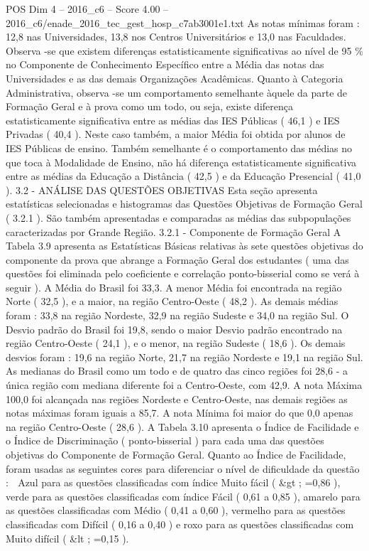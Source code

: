 \begin{textsample}{POS Dim 4 – 2016\_c6 – Score 4.00 – 2016\_c6/enade\_2016\_tec\_gest\_hosp\_c7ab3001e1.txt}
As notas mínimas foram : 12,8 nas Universidades, 13,8 nos Centros Universitários e 13,0 nas Faculdades.
Observa -se que existem diferenças estatisticamente significativas ao nível de 95 \% no Componente de Conhecimento Específico entre a Média das notas das Universidades e as das demais Organizações Acadêmicas.
Quanto à Categoria Administrativa, observa -se um comportamento semelhante àquele da parte de Formação Geral e à prova como um todo, ou seja, existe diferença estatisticamente significativa entre as médias das IES Públicas ( 46,1 ) e IES Privadas ( 40,4 ).
Neste caso também, a maior Média foi obtida por alunos de IES Públicas de ensino.
Também semelhante é o comportamento das médias no que toca à Modalidade de Ensino, não há diferença estatisticamente significativa entre as médias da Educação a Distância ( 42,5 ) e da Educação Presencial ( 41,0 ). 3.2 - ANÁLISE DAS QUESTÕES OBJETIVAS Esta seção apresenta estatísticas selecionadas e histogramas das Questões Objetivas de Formação Geral ( 3.2.1 ).
São também apresentadas e comparadas as médias das subpopulações caracterizadas por Grande Região. 3.2.1 - Componente de Formação Geral A Tabela 3.9 apresenta as Estatísticas Básicas relativas às sete questões objetivas do componente da prova que abrange a Formação Geral dos estudantes ( uma das questões foi eliminada pelo coeficiente e correlação ponto-bisserial como se verá à seguir ).
A Média do Brasil foi 33,3.
A menor Média foi encontrada na região Norte ( 32,5 ), e a maior, na região Centro-Oeste ( 48,2 ).
As demais médias foram : 33,8 na região Nordeste, 32,9 na região Sudeste e 34,0 na região Sul.
O Desvio padrão do Brasil foi 19,8, sendo o maior Desvio padrão encontrado na região Centro-Oeste ( 24,1 ), e o menor, na região Sudeste ( 18,6 ).
Os demais desvios foram : 19,6 na região Norte, 21,7 na região Nordeste e 19,1 na região Sul.
As medianas do Brasil como um todo e de quatro das cinco regiões foi 28,6 - a única região com mediana diferente foi a Centro-Oeste, com 42,9.
A nota Máxima 100,0 foi alcançada nas regiões Nordeste e Centro-Oeste, nas demais regiões as notas máximas foram iguais a 85,7.
A nota Mínima foi maior do que 0,0 apenas na região Centro-Oeste ( 28,6 ).
A Tabela 3.10 apresenta o Índice de Facilidade e o Índice de Discriminação ( ponto-bisserial ) para cada uma das questões objetivas do Componente de Formação Geral.
Quanto ao Índice de Facilidade, foram usadas as seguintes cores para diferenciar o nível de dificuldade da questão :  Azul para as questões classificadas com índice Muito fácil ( \&gt ; =0,86 ), verde para as questões classificadas com índice Fácil ( 0,61 a 0,85 ), amarelo para as questões classificadas com Médio ( 0,41 a 0,60 ), vermelho para as questões classificadas com Difícil ( 0,16 a 0,40 ) e roxo para as questões classificadas com Muito difícil ( \&lt ; =0,15 ).

\end{textsample}
